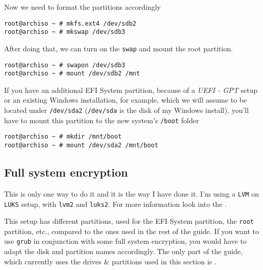 \documentclass[10pt]{dustdoc}
\begin{document}
Now we need to format the partitions accordingly

\begin{verbatim}
root@archiso ~ # mkfs.ext4 /dev/sdb2
root@archiso ~ # mkswap /dev/sdb3
\end{verbatim}

After doing that, we can turn on the \texttt{swap} and mount the root partition.

\begin{verbatim}
root@archiso ~ # swapon /dev/sdb3
root@archiso ~ # mount /dev/sdb2 /mnt
\end{verbatim}

\begin{NOTE}
    If you have an additional EFI System partition, because of a \emph{UEFI - GPT} setup or an existing Windows installation, for example, which we will assume to be located under \texttt{/dev/sda2} (\texttt{/dev/sda} is the disk of my Windows install), you’ll have to mount this partition to the new system's \texttt{/boot} folder

    \begin{verbatim}
root@archiso ~ # mkdir /mnt/boot
root@archiso ~ # mount /dev/sda2 /mnt/boot
    \end{verbatim}
\end{NOTE}

\subsection{Full system encryption}
\label{sec:full-system-encryption}

\begin{NOTE}
    This is only one way to do it and it is the way I have done it.
    I’m using a \texttt{LVM} on \texttt{LUKS} setup, with \texttt{lvm2} and \texttt{luks2}.
    For more information look into the .
\end{NOTE}

\begin{NOTE}
    This setup has different partitions, used for the EFI System partition, the \texttt{root} partition, etc., compared to the ones used in the rest of the guide.
    If you want to use \texttt{grub} in conjunction with some full system encryption, you would have to adapt the disk and partition names accordingly.
    The only part of the guide, which currently uses the drives \& partitions used in this section is .
\end{NOTE}
\end{document}
